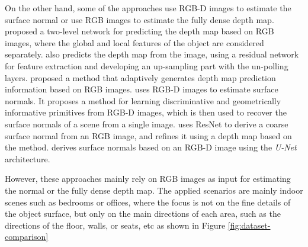On the other hand, some of the approaches use RGB-D images to estimate the surface normal or use RGB images to estimate the fully dense depth map.
\cite{Eigen} proposed a two-level network for predicting the depth map based on RGB images, where the global and local features of the object are considered separately. \cite{img2depth} also predicts the depth map from the image, using a residual network for feature extraction and developing an up-sampling part with the un-polling layers. 
\cite{binsformer} proposed a method that adaptively generates depth map prediction information based on RGB images. 
\cite{geometry_based_solution} uses RGB-D images to estimate surface normals. It proposes a method for learning discriminative and geometrically informative primitives from RGB-D images, which is then used to recover the surface normals of a scene from a single image. 
\cite{GeoNet} uses ResNet \cite{resnet} to derive a coarse surface normal from an RGB image, and refines it using a depth map based on the \cite{geometry_based_solution} method. 
\cite{hfm} derives surface normals based on an RGB-D image using the \textit{U-Net} architecture.

However, these approaches mainly rely on RGB images as input for estimating the normal or the fully dense depth map. The applied scenarios are mainly indoor scenes such as bedrooms or offices, where the focus is not on the fine details of the object surface, but only on the main directions of each area, such as the directions of the floor, walls, or seats, etc as shown in Figure \ref{fig:dataset-comparison}

